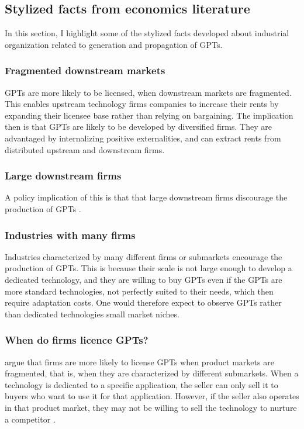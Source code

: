 \documentclass[12pt,letterpaper]{article}
\begin{document}
\subsection{Stylized facts from economics literature}
In this section, I highlight some of the stylized facts developed about industrial organization related to generation and propagation of GPTs.
\subsubsection{Fragmented downstream markets}
GPTs are more likely to be licensed, when downstream markets are fragmented. This enables upstream technology firms companies to increase their rents by expanding their licensee base rather than relying on bargaining. The implication then is that GPTs are likely to be developed by diversified firms. They are advantaged by internalizing positive externalities, and can extract rents from distributed upstream and downstream firms. 
\subsubsection{Large downstream firms} A policy implication of this is that that large downstream firms discourage the production
of GPTs \citep{Bresnahan1998}.
\subsubsection{Industries with many firms} Industries characterized by many different firms or submarkets encourage the production of GPTs. This is because their scale is not large enough to develop a dedicated technology, and they are willing to buy GPTs even if the GPTs are more standard technologies, not perfectly suited to their needs, which then require adaptation costs. One would therefore expect to observe GPTs rather than dedicated technologies small market niches.
\subsubsection{When do firms licence GPTs?} \cite{Gambardella2013}  argue that firms are more likely to license GPTs when product markets are fragmented, that is, when they are characterized by different submarkets. When a technology is dedicated to a specific application, the seller can only sell it to buyers who want to use it for that application. However, if the seller also operates in that product market, they may not be willing to sell the technology to nurture a competitor \cite{Arora2003}. 
\end{document}
